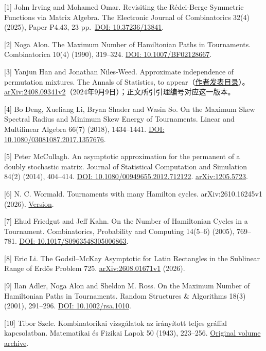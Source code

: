 \documentclass[11pt,a4paper]{article}
\begin{document}
{[}1{]} John Irving and Mohamed Omar. Revisiting the Rédei-Berge Symmetric Functions via Matrix Algebra. The Electronic Journal of Combinatorics 32(4) (2025), Paper P4.43, 23 pp.~\href{https://doi.org/10.37236/13841}{DOI: 10.37236/13841}.

{[}2{]} Noga Alon. The Maximum Number of Hamiltonian Paths in Tournaments. Combinatorica 10(4) (1990), 319--324. \href{https://doi.org/10.1007/BF02128667}{DOI: 10.1007/BF02128667}.

{[}3{]} Yanjun Han and Jonathan Niles-Weed. Approximate independence of permutation mixtures. The Annals of Statistics, to appear（\href{https://yanjunhan2021.github.io/publication.html}{作者发表目录}）。\href{https://arxiv.org/html/2408.09341v2}{arXiv:2408.09341v2}（2024年9月9日）；正文所引引理编号对应这一版本。

{[}4{]} Bo Deng, Xueliang Li, Bryan Shader and Wasin So. On the Maximum Skew Spectral Radius and Minimum Skew Energy of Tournaments. Linear and Multilinear Algebra 66(7) (2018), 1434--1441. \href{https://doi.org/10.1080/03081087.2017.1357676}{DOI: 10.1080/03081087.2017.1357676}.

{[}5{]} Peter McCullagh. An asymptotic approximation for the permanent of a doubly stochastic matrix. Journal of Statistical Computation and Simulation 84(2) (2014), 404--414. \href{https://doi.org/10.1080/00949655.2012.712122}{DOI: 10.1080/00949655.2012.712122}. \href{https://arxiv.org/abs/1205.5723}{arXiv:1205.5723}.

{[}6{]} N. C. Wormald. Tournaments with many Hamilton cycles. arXiv:2610.16245v1 (2026). \href{https://arxiv.org/html/2610.16245v1}{Version}.

{[}7{]} Ehud Friedgut and Jeff Kahn. On the Number of Hamiltonian Cycles in a Tournament. Combinatorics, Probability and Computing 14(5--6) (2005), 769--781. \href{https://doi.org/10.1017/S0963548305006863}{DOI: 10.1017/S0963548305006863}.

{[}8{]} Eric Li. The Godsil--McKay Asymptotic for Latin Rectangles in the Sublinear Range of Erdős Problem 725. \href{https://arxiv.org/html/2608.01671v1}{arXiv:2608.01671v1} (2026).

{[}9{]} Ilan Adler, Noga Alon and Sheldon M. Ross. On the Maximum Number of Hamiltonian Paths in Tournaments. Random Structures \& Algorithms 18(3) (2001), 291--296. \href{https://doi.org/10.1002/rsa.1010}{DOI: 10.1002/rsa.1010}.

{[}10{]} Tibor Szele. Kombinatorikai vizsgálatok az irányított teljes gráffal kapcsolatban. Matematikai és Fizikai Lapok 50 (1943), 223--256. \href{https://real-j.mtak.hu/7300/}{Original volume archive}.
\end{document}
